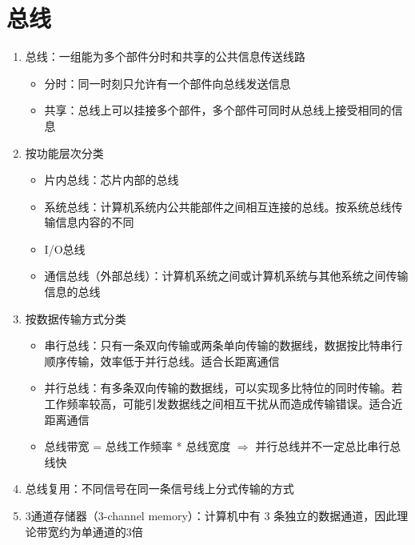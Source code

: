 \documentclass[./computer-organization-and-architecture.tex]{subfiles}
\begin{document}
    \section{总线}

    \begin{enumerate}
        \item 总线：一组能为多个部件分时和共享的公共信息传送线路
        \begin{itemize}
            \item 分时：同一时刻只允许有一个部件向总线发送信息
            \item 共享：总线上可以挂接多个部件，多个部件可同时从总线上接受相同的信息
        \end{itemize}
        \item 按功能层次分类
        \begin{itemize}
            \item 片内总线：芯片内部的总线
            \item 系统总线：计算机系统内公共能部件之间相互连接的总线。按系统总线传输信息内容的不同
            \item I/O总线
            \item 通信总线（外部总线）：计算机系统之间或计算机系统与其他系统之间传输信息的总线
        \end{itemize}
        \item 按数据传输方式分类
        \begin{itemize}
            \item 串行总线：只有一条双向传输或两条单向传输的数据线，数据按比特串行顺序传输，效率低于并行总线。适合长距离通信
            \item 并行总线：有多条双向传输的数据线，可以实现多比特位的同时传输。若工作频率较高，可能引发数据线之间相互干扰从而造成传输错误。适合近距离通信
            \item 总线带宽 = 总线工作频率 * 总线宽度 $\Rightarrow$ 并行总线并不一定总比串行总线快
        \end{itemize}
        \item 总线复用：不同信号在同一条信号线上分式传输的方式
        \item 3通道存储器（3-channel memory）：计算机中有 3 条独立的数据通道，因此理论带宽约为单通道的3倍
    \end{enumerate}
\end{document}
